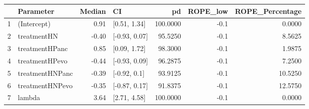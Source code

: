 \begin{table}[ht]
\centering
\begin{tabular}{llrlrrr}
  \hline
 & Parameter & Median & CI & pd & ROPE\_low & ROPE\_Percentage \\ 
  \hline
1 & (Intercept) & 0.91 & [0.51, 1.34] & 100.0000 & -0.1 & 0.0000 \\ 
  2 & treatmentHN & -0.40 & [-0.93, 0.07] & 95.5250 & -0.1 & 8.5625 \\ 
  3 & treatmentHPanc & 0.85 & [0.09, 1.72] & 98.3000 & -0.1 & 1.9875 \\ 
  4 & treatmentHPevo & -0.44 & [-0.93, 0.09] & 96.2875 & -0.1 & 7.2500 \\ 
  5 & treatmentHNPanc & -0.39 & [-0.92, 0.1] & 93.9125 & -0.1 & 10.5250 \\ 
  6 & treatmentHNPevo & -0.35 & [-0.87, 0.17] & 91.8375 & -0.1 & 12.5750 \\ 
  7 & lambda & 3.64 & [2.71, 4.58] & 100.0000 & -0.1 & 0.0000 \\ 
   \hline
\end{tabular}
\end{table}

